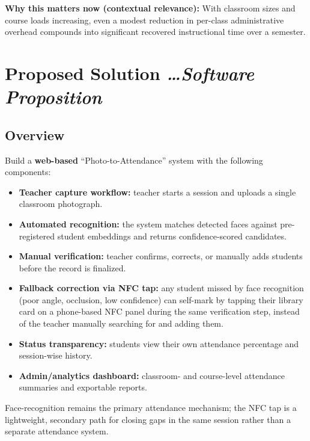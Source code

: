 \documentclass[11pt,a4paper]{article}
\newcommand{\BvrHint}[1]{%
  {\normalfont\normalsize\itshape\hfill #1}}
\begin{document}
\textbf{Why this matters now (contextual relevance):} With classroom
sizes and course loads increasing, even a modest reduction in
per-class administrative overhead compounds into significant
recovered instructional time over a semester.

\section{Proposed Solution %
\BvrHint{\ldots Software Proposition}}
\subsection{Overview}
Build a \textbf{web-based} ``Photo-to-Attendance'' system with the
following components:
\begin{itemize}[leftmargin=0.7cm]
    \item \textbf{Teacher capture workflow:} teacher starts a session and uploads a single classroom photograph.
    \item \textbf{Automated recognition:} the system matches detected faces against pre-registered student embeddings and returns confidence-scored candidates.
    \item \textbf{Manual verification:} teacher confirms, corrects, or manually adds students before the record is finalized.
    \item \textbf{Fallback correction via NFC tap:} any student missed by face recognition (poor angle, occlusion, low confidence) can self-mark by tapping their library card on a phone-based NFC panel during the same verification step, instead of the teacher manually searching for and adding them.
    \item \textbf{Status transparency:} students view their own attendance percentage and session-wise history.
    \item \textbf{Admin/analytics dashboard:} classroom- and course-level attendance summaries and exportable reports.
\end{itemize}
Face-recognition remains the primary attendance mechanism; the NFC
tap is a lightweight, secondary path for closing gaps in the same
session rather than a separate attendance system.
\end{document}
